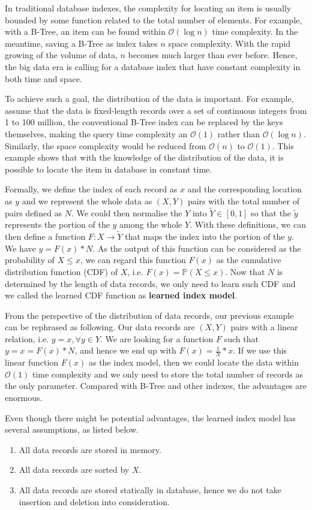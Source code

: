 In traditional database indexes, the complexity for locating an item is usually bounded by some function related to the total number of elements. For example, with a B-Tree, an item can be found within $\mathcal{O}(\log n)$ time complexity. In the meantime, saving a B-Tree as index takes $n$ space complexity. With the rapid growing of the volume of data, $n$ becomes much larger than ever before. Hence, the big data era is calling for a database index that have constant complexity in both time and space.

To achieve such a goal, the distribution of the data is important. For example, assume that the data is fixed-length records over a set of continuous integers from 1 to 100 million, the conventional B-Tree index can be replaced by the keys themselves, making the query time complexity an $\mathcal{O}(1)$ rather than $\mathcal{O}(\log n)$. Similarly, the space complexity would be reduced from $\mathcal{O}(n)$ to $\mathcal{O}(1)$. This example shows that with the knowledge of the distribution of the data, it is possible to locate the item in database in constant time.

Formally, we define the index of each record as $x$ and the corresponding location as $y$ and we represent the whole data as $(X, Y)$ pairs with the total number of pairs defined as $N$. We could then normalise the $Y$ into $\tilde{Y}\in[0,1]$ so that the $\tilde{y}$ represents the portion of the $y$ among the whole $Y$. With these definitions, we can then define a function $F:X\to \tilde{Y}$ that maps the index into the portion of the $y$. We have $y=F(x)* N$. As the output of this function can be considered as the probability of $X\leq x$, we can regard this function $F(x)$ as the cumulative distribution function (CDF) of $X$, i.e. $F(x)=\mathbb{P}(X\leq x)$. Now that $N$ is determined by the length of data records, we only need to learn such CDF and we called the learned CDF function as \textbf{learned index model}.

From the perspective of the distribution of data records, our previous example can be rephrased as following. Our data records are $(X, Y)$ pairs with a linear relation, i.e. $y=x, \forall y\in Y$. We are looking for a function $F$ such that $y=x=F(x)* N$, and hence we end up with $F(x)=\frac{1}{N}*x$. If we use this linear function $F(x)$ as the index model, then we could locate the data within $\mathcal{O}(1)$ time complexity and we only need to store the total number of records as the only parameter. Compared with B-Tree and other indexes, the advantages are enormous.

Even though there might be potential advantages, the learned index model has several assumptions, as listed below.
\begin{enumerate}
	\item All data records are stored in memory. 
	\item All data records are sorted by $X$.
	\item All data records are stored statically in database, hence we do not take insertion and deletion into consideration.
\end{enumerate}